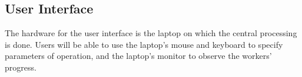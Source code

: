 
\subsection{User Interface}
\label{sec:hardware_ui}

The hardware for the user interface is the laptop on which the central processing is done. Users will be able to use the laptop's mouse and keyboard to specify parameters of operation, and the laptop's monitor to observe the workers' progress.